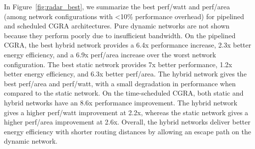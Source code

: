 In Figure~\ref{fig:radar_best}, we summarize the best perf/watt and perf/area (among network configurations with <10\% performance overhead) for pipelined and scheduled CGRA architectures. 
Pure dynamic networks are not shown because they perform poorly due to insufficient bandwidth.
On the pipelined CGRA, the best hybrid network provides a 6.4x performance increase, 2.3x better energy efficiency, and a 6.9x perf/area increase over the worst network configuration. 
The best static network provides 7x better performance, 1.2x better energy efficiency, and 6.3x better perf/area. 
The hybrid network gives the best perf/area and perf/watt, with a small degradation in performance when compared to the static network. 
On the time-scheduled CGRA, both static and hybrid networks have an 8.6x performance improvement. 
The hybrid network gives a higher perf/watt improvement at 2.2x, whereas the static network gives a higher perf/area improvement at 2.6x.
Overall, the hybrid networks deliver better energy efficiency with shorter routing distances by allowing an escape path on the dynamic network.





